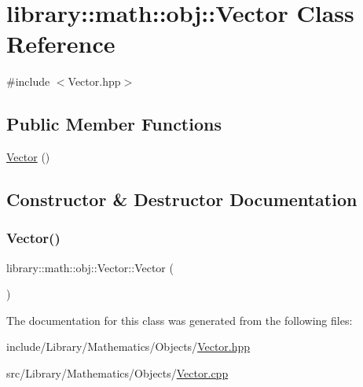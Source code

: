 \hypertarget{classlibrary_1_1math_1_1obj_1_1_vector}{}\section{library\+:\+:math\+:\+:obj\+:\+:Vector Class Reference}
\label{classlibrary_1_1math_1_1obj_1_1_vector}


{\ttfamily \#include $<$Vector.\+hpp$>$}

\subsection*{Public Member Functions}
\begin{DoxyCompactItemize}
\item 
\hyperlink{classlibrary_1_1math_1_1obj_1_1_vector_a3f30f7bb9b513af495d1d1dc12ae043e}{Vector} ()
\end{DoxyCompactItemize}


\subsection{Constructor \& Destructor Documentation}
\mbox{\label{classlibrary_1_1math_1_1obj_1_1_vector_a3f30f7bb9b513af495d1d1dc12ae043e}} 
\subsubsection{\texorpdfstring{Vector()}{Vector()}}
{\footnotesize\ttfamily library\+::math\+::obj\+::\+Vector\+::\+Vector (\begin{DoxyParamCaption}{ }\end{DoxyParamCaption})}



The documentation for this class was generated from the following files\+:\begin{DoxyCompactItemize}
\item 
include/\+Library/\+Mathematics/\+Objects/\hyperlink{_vector_8hpp}{Vector.\+hpp}\item 
src/\+Library/\+Mathematics/\+Objects/\hyperlink{_vector_8cpp}{Vector.\+cpp}\end{DoxyCompactItemize}
